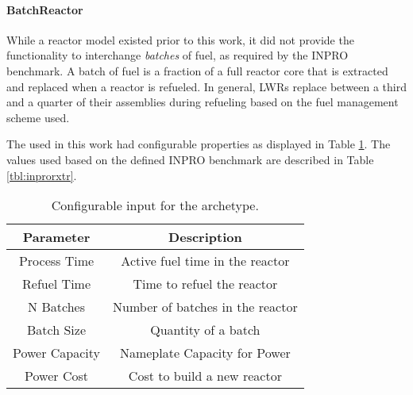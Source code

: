 \paragraph{BatchReactor}

While a reactor model existed prior to this work, it did not provide the
functionality to interchange \textit{batches} of fuel, as required by the INPRO
benchmark. A batch of fuel is a fraction of a full reactor core that is
extracted and replaced when a reactor is refueled. In general, LWRs replace
between a third and a quarter of their assemblies during refueling based on the
fuel management scheme used.

The  used in this work had configurable properties as
displayed in Table \ref{tbl:batchrxtr}. The values used based on the defined
INPRO benchmark are described in Table \ref{tbl:inprorxtr}.

\begin{table}[h]
\centering
\begin{tabular}{cc}
Parameter      & Description                     \\ \hline
Process Time   & Active fuel time in the reactor                        \\
Refuel Time    & Time to refuel the reactor                              \\
N Batches      & Number of batches in the reactor                         \\
Batch Size     & Quantity of a batch                                 \\
Power Capacity & Nameplate Capacity for Power                          \\
Power Cost     & Cost to build a new reactor      \\ \hline
\end{tabular}
\caption{Configurable input for the  archetype.}
\label{tbl:batchrxtr}
\end{table}

